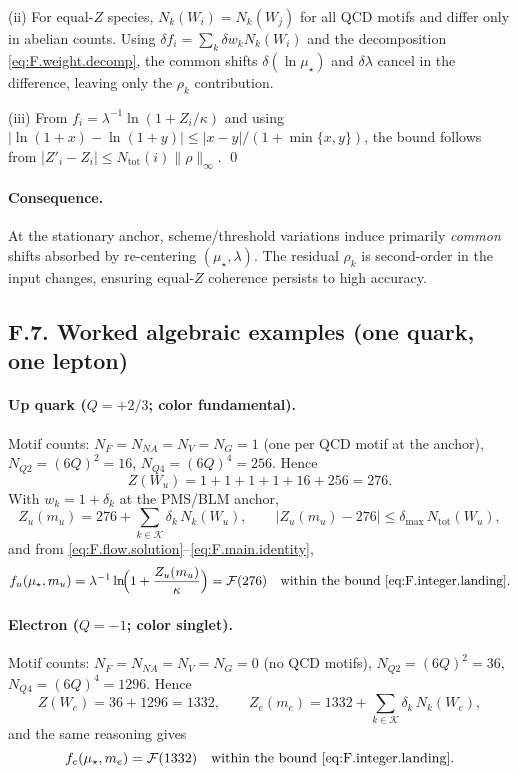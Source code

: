 \documentclass[epjc3]{svjour3}
\begin{document}
(ii) For equal-$Z$ species, $N_k(W_i) = N_k(W_j)$ for all QCD motifs and differ only in abelian counts. Using $\delta f_i = \sum_k \delta w_k N_k(W_i)$ and the decomposition \eqref{eq:F.weight.decomp}, the common shifts $\delta(\ln\mu_\star)$ and $\delta\lambda$ cancel in the difference, leaving only the $\rho_k$ contribution.

(iii) From $f_i = \lambda^{-1}\ln(1 + Z_i/\kappa)$ and using $|\ln(1+x) - \ln(1+y)| \le |x-y|/(1+\min\{x,y\})$, the bound follows from $|Z'_i - Z_i| \le N_{\mathrm{tot}}(i)\|\rho\|_\infty$. \qed

\paragraph{Consequence.} At the stationary anchor, scheme/threshold variations induce primarily \emph{common} shifts absorbed by re-centering $(\mu_\star,\lambda)$. The residual $\rho_k$ is second-order in the input changes, ensuring equal-$Z$ coherence persists to high accuracy.


\subsection*{F.7. Worked algebraic examples (one quark, one lepton)}
\paragraph{Up quark ($Q=+2/3$; color fundamental).}
Motif counts: $N_F=N_{NA}=N_V=N_G=1$ (one per QCD motif at the anchor), $N_{Q2}=(6Q)^2=16$, $N_{Q4}=(6Q)^4=256$.  Hence
\[
  Z(W_u)=1+1+1+1+16+256=276.
\]
With $w_k=1+\delta_k$ at the PMS/BLM anchor,
\[
  Z_u(m_u)=276+\sum_{k\in\mathcal K}\delta_k\,N_k(W_u),
\qquad
\bigl|Z_u(m_u)-276\bigr|\le \delta_{\max}\,N_{\mathrm{tot}}(W_u),
\]
and from \eqref{eq:F.flow.solution}--\eqref{eq:F.main.identity},
\[
  f_u(\mu_\star,m_u)=\lambda^{-1}\ln\!\Bigl(1+\frac{Z_u(m_u)}{\kappa}\Bigr)
  =\mathcal F(276)
  \quad\text{within the bound \eqref{eq:F.integer.landing}.}
\]


\paragraph{Electron ($Q=-1$; color singlet).}
Motif counts: $N_F=N_{NA}=N_V=N_G=0$ (no QCD motifs), $N_{Q2}=(6Q)^2=36$, $N_{Q4}=(6Q)^4=1296$.  Hence
\[
  Z(W_e)=36+1296=1332,\qquad
  Z_e(m_e)=1332+\sum_{k\in\mathcal K}\delta_k\,N_k(W_e),
\]
and the same reasoning gives
\[
  f_e(\mu_\star,m_e)=\mathcal F(1332)
  \quad\text{within the bound \eqref{eq:F.integer.landing}.}
\]
\end{document}
